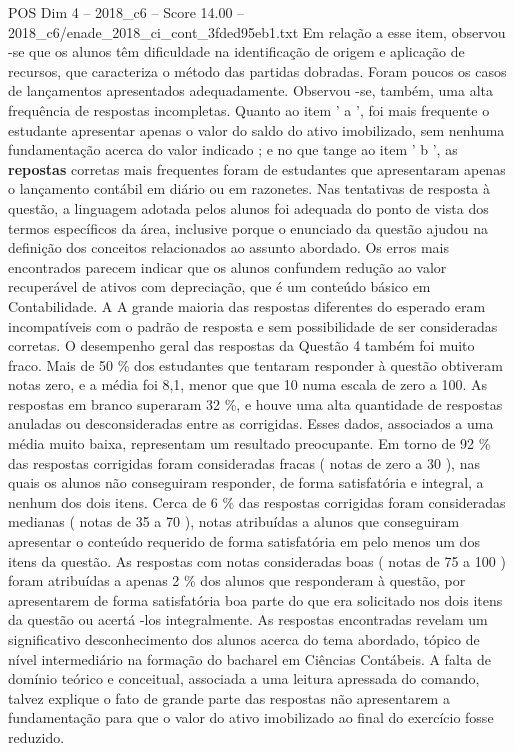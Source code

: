 \begin{textsample}{POS Dim 4 – 2018\_c6 – Score 14.00 – 2018\_c6/enade\_2018\_ci\_cont\_3fded95eb1.txt}
Em relação a esse item, observou -se que os alunos têm dificuldade na identificação de origem e aplicação de recursos, que caracteriza o método das partidas dobradas.
Foram poucos os casos de lançamentos apresentados adequadamente.
Observou -se, também, uma alta frequência de respostas incompletas.
Quanto ao item ' a ', foi mais frequente o estudante apresentar apenas o valor do saldo do ativo imobilizado, sem nenhuma fundamentação acerca do valor indicado ; e no que tange ao item ' b ', as \textbf{repostas} corretas mais frequentes foram de estudantes que apresentaram apenas o lançamento contábil em diário ou em razonetes.
Nas tentativas de resposta à questão, a linguagem adotada pelos alunos foi adequada do ponto de vista dos termos específicos da área, inclusive porque o enunciado da questão ajudou na definição dos conceitos relacionados ao assunto abordado.
Os erros mais encontrados parecem indicar que os alunos confundem redução ao valor recuperável de ativos com depreciação, que é um conteúdo básico em Contabilidade.
A A grande maioria das respostas diferentes do esperado eram incompatíveis com o padrão de resposta e sem possibilidade de ser consideradas corretas.
O desempenho geral das respostas da Questão 4 também foi muito fraco.
Mais de 50 \% dos estudantes que tentaram responder à questão obtiveram notas zero, e a média foi 8,1, menor que que 10 numa escala de zero a 100.
As respostas em branco superaram 32 \%, e houve uma alta quantidade de respostas anuladas ou desconsideradas entre as corrigidas.
Esses dados, associados a uma média muito baixa, representam um resultado preocupante.
Em torno de 92 \% das respostas corrigidas foram consideradas fracas ( notas de zero a 30 ), nas quais os alunos não conseguiram responder, de forma satisfatória e integral, a nenhum dos dois itens.
Cerca de 6 \% das respostas corrigidas foram consideradas medianas ( notas de 35 a 70 ), notas atribuídas a alunos que conseguiram apresentar o conteúdo requerido de forma satisfatória em pelo menos um dos itens da questão.
As respostas com notas consideradas boas ( notas de 75 a 100 ) foram atribuídas a apenas 2 \% dos alunos que responderam à questão, por apresentarem de forma satisfatória boa parte do que era solicitado nos dois itens da questão ou acertá -los integralmente.
As respostas encontradas revelam um significativo desconhecimento dos alunos acerca do tema abordado, tópico de nível intermediário na formação do bacharel em Ciências Contábeis.
A falta de domínio teórico e conceitual, associada a uma leitura apressada do comando, talvez explique o fato de grande parte das respostas não apresentarem a fundamentação para que o valor do ativo imobilizado ao final do exercício fosse reduzido.

\end{textsample}
